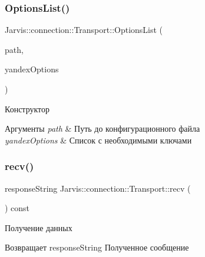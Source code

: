 \subsubsection{\texorpdfstring{Options\+List()}{OptionsList()}}
{\footnotesize\ttfamily Jarvis\+::connection\+::\+Transport\+::\+Options\+List (\begin{DoxyParamCaption}\item[{const j\+Path \&}]{path,  }\item[{const yandex\+Options}]{yandex\+Options }\end{DoxyParamCaption})\hspace{0.3cm}{\ttfamily [explicit]}}



Конструктор 


\begin{DoxyParams}{Аргументы}
{\em path} & Путь до конфигурационного файла \\
\hline
{\em yandex\+Options} & Список с необходимыми ключами \\
\hline
\end{DoxyParams}
\mbox{\label{classJarvis_1_1connection_1_1Transport_a25b1e13d35fe44466a4f5bdddd8ea499}} 
\subsubsection{\texorpdfstring{recv()}{recv()}}
{\footnotesize\ttfamily response\+String Jarvis\+::connection\+::\+Transport\+::recv (\begin{DoxyParamCaption}{ }\end{DoxyParamCaption}) const}



Получение данных 

\begin{DoxyReturn}{Возвращает}
response\+String Полученное сообщение 
\end{DoxyReturn}
\mbox{\label{classJarvis_1_1connection_1_1Transport_ad0116f6773802fd75ea6795313051a96}} 
